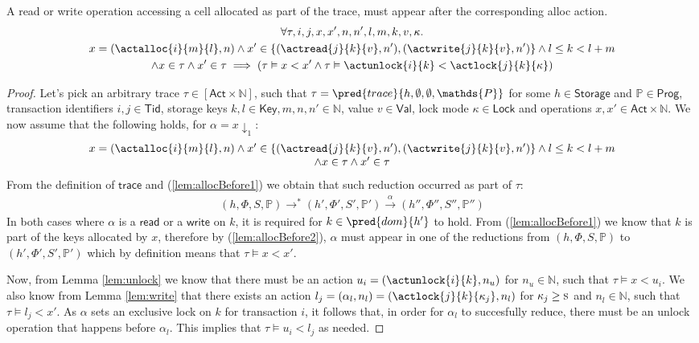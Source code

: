 \lem \label{lem:allocBefore} A read or write operation accessing a cell allocated as part of the trace, must appear after the corresponding alloc action.
\begin{gather*}
	\forall \tau, i, j, x, x', n, n', l, m, k, v, \kappa \ldotp \\
	x = (\actalloc{i}{m}{l}, n) \land x' \in \{ (\actread{j}{k}{v}, n'), (\actwrite{j}{k}{v}, n') \} \land l \leq k < l + m
	\\
	\land x \in \tau \land x' \in \tau
	\implies
	\left( \tau \vDash x < x'  \land \tau \vDash \actunlock{i}{k} < \actlock{j}{k}{\kappa} \right)
\end{gather*}
\begin{proof}
Let's pick an arbitrary trace $\tau \in [\mathsf{Act} \times \mathds{N}]$, such that $\tau = \pred{trace}{h, \emptyset, \emptyset, \mathds{P}}$ for some $h \in \mathsf{Storage}$ and $\mathds{P} \in \mathsf{Prog}$, transaction identifiers $i, j \in \mathsf{Tid}$, storage keys $k, l \in \mathsf{Key}, m, n, n' \in \mathds{N}$, value $v \in \mathsf{Val}$, lock mode $\kappa \in \mathsf{Lock}$ and operations $x, x' \in \mathsf{Act} \times \mathds{N}$. We now assume that the following holds, for $\alpha = x \downarrow_1$:
\begin{gather}
	\label{lem:allocBefore1}
	\begin{array}{c}
		x = (\actalloc{i}{m}{l}, n) \land x' \in \{ (\actread{j}{k}{v}, n'), (\actwrite{j}{k}{v}, n') \} \land l \leq k < l + m
		\\
		\land x \in \tau \land x' \in \tau
	\end{array}
\end{gather}
From the definition of $\mathsf{trace}$ and (\ref{lem:allocBefore1}) we obtain that such reduction occurred as part of $\tau$:
\begin{gather}
	\label{lem:allocBefore2}	
	(h, \Phi, S, \mathds{P}) \rightarrow^* (h', \Phi', S', \mathds{P}') \xrightarrow{\alpha} (h'', \Phi'', S'', \mathds{P}'')
\end{gather}
In both cases where $\alpha$ is a $\mathsf{read}$ or a $\mathsf{write}$ on $k$, it is required for $k \in \pred{dom}{h'}$ to hold. From (\ref{lem:allocBefore1}) we know that $k$ is part of the keys allocated by $x$, therefore by (\ref{lem:allocBefore2}), $\alpha$ must appear in one of the reductions from $(h, \Phi, S, \mathds{P})$ to $(h', \Phi', S', \mathds{P}')$ which by definition means that $\tau \vDash x < x'$.

Now, from Lemma \ref{lem:unlock} we know that there must be an action $u_i = (\actunlock{i}{k}, n_u)$ for $n_u \in \mathds{N}$, such that $\tau \vDash x < u_i$.
We also know from Lemma \ref{lem:write} that there exists an action $l_j = (\alpha_l, n_l) = (\actlock{j}{k}{\kappa_j}, n_l)$ for $\kappa_j \geq \textsc{s}$ and $n_l \in \mathds{N}$, such that $\tau \vDash l_j < x'$. As $\alpha$ sets an exclusive lock on $k$ for transaction $i$, it follows that, in order for $\alpha_l$ to succesfully reduce, there must be an unlock operation that happens before $\alpha_l$. This implies that $\tau \vDash u_i < l_j$ as needed.
\end{proof}

